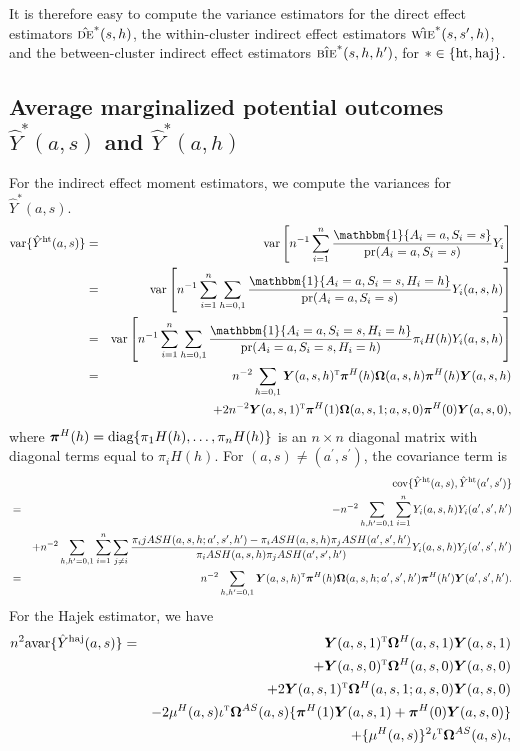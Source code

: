 \documentclass{article}
\def\T{{\textsc{t}}}
\newcommand{\pr}{\textup{pr}}
\newcommand{\cov}{\textup{cov}}
\newcommand{\var}{\textup{var}}
\newcommand{\avar}{\textup{avar}}
\newcommand{\bY}{\boldsymbol{Y}}
\newcommand{\bpi}{\boldsymbol{\pi}}
\newcommand{\bOmega}{\boldsymbol{\Omega}}
\newcommand{\sumi}{\sum_{i=1}^n}
\newcommand{\sumjneqi}{\sum_{j\neq i}}
\newcommand{\de}{\textsc{de}}
\newcommand{\bie}{\textsc{bie}}
\newcommand{\wie}{\textsc{wie}}
\newcommand{\horthom}{\textup{ht}}
\newcommand{\haj}{\textup{haj}}
\newcommand{\diag}{\textup{diag}}
\newcommand{\indicator}{\mathbbm{1}}
\newcommand{\ashprime}{a^{\prime},s^{\prime},h^{\prime}}
\newcommand{\pscore}[1]{\pi_{#1}}
\begin{document}
It is therefore easy to compute the variance estimators for the direct effect estimators $\hat{\de}^{*}(s,h)$, the within-cluster indirect effect estimators $\hat{\wie}^{*}(s,s^{\prime},h)$, and the between-cluster indirect effect estimators $\hat{\bie}^{*}(s,h,h^{\prime})$, for $*\in\{\horthom,\haj\}$.

\subsection{Average marginalized potential outcomes $\hat Y^{*}(a,s)$ and $\hat Y^{*}(a,h)$}
For the indirect effect moment estimators, we compute the variances for $\hat{Y}^{*}(a,s)$.
\begin{eqnarray*}
    \var\{\hat{Y}^{\horthom}(a,s)\} &=& \var \left[ n^{-1}\sumi\frac{ \indicator\{A_{i}=a, S_{i}=s\} }{ \pr(A_{i}=a, S_{i}=s)}Y_{i}\right] \\
    &=& \var \left[ n^{-1}\sumi\sum_{h=0,1}\frac{ \indicator\{A_{i}=a, S_{i}=s,H_i=h\} }{ \pr(A_{i}=a, S_{i}=s)}Y_{i}(a,s,h)\right] \\
    &=& \var \left[ n^{-1}\sumi\sum_{h=0,1}\frac{ \indicator\{A_{i}=a, S_{i}=s,H_i=h\} }{ \pr(A_{i}=a, S_{i}=s, H_{i}=h)}\pscore{i}{H}(h)Y_{i}(a,s,h)\right] \\
    &=& n^{-2} \sum_{h=0,1}\bY(a,s,h)^{\T}\bpi^{H}(h)\bOmega(a,s,h)\bpi^{H}(h)\bY(a,s,h) \\
    &&+ 2n^{-2}\bY(a,s,1)^{\T}\bpi^{H}(1)\bOmega(a,s,1;a,s,0)\bpi^{H}(0)\bY(a,s,0),
\end{eqnarray*}
where $\bpi^{H}(h) = \diag\{\pscore{1}{}{H}(h), \ldots, \pscore{n}{}{H}(h)\}$ is an $n\times n$ diagonal matrix with diagonal terms equal to $\pscore{i}{H}(h)$.
For $(a,s)\neq(a^{\prime},s^{\prime})$, the covariance term is
\begin{eqnarray*}
    && \cov\{\hat{Y}^{\horthom}(a,s), \hat{Y}^{\horthom}(a^{\prime},s^{\prime})\} \\
    &=& -n^{-2}\sum_{h,h^{\prime}=0,1}\sumi  Y_i(a, s, h) Y_i(\ashprime) \\ 
    &&+ n^{-2}\sum_{h,h^{\prime}=0,1}\sumi\sumjneqi \frac{\pscore{i}{j}{ASH}(a, s, h; \ashprime) - \pscore{i}{ASH}(a, s, h)\pscore{j}{}{ASH}(\ashprime)}{\pscore{i}{ASH}(a, s, h)\pscore{j}{}{ASH}(\ashprime)} Y_i(a, s, h) Y_j(\ashprime) \\
    &=& n^{-2}\sum_{h, h^{\prime}=0,1} \bY(a,s,h)^{\T} \bpi^{H}(h)\bOmega(a,s,h;\ashprime)\bpi^{H}(h^{\prime}) \bY(\ashprime).
\end{eqnarray*}
For the Hajek estimator, we have
\begin{eqnarray*}
    n^2\avar\{\hat Y^{\haj}(a,s)\} &=& \bY(a,s,1)^{\T} \bOmega^{H}(a,s,1) \bY(a,s,1) \\
    &&+ \bY(a,s,0)^{\T} \bOmega^{H}(a,s,0) \bY(a,s,0) \\
    &&+ 2\bY(a,s,1)^{\T} \bOmega^{H}(a,s,1;a,s,0) \bY(a,s,0) \\
    &&- 2\mu^{H}(a,s) \iota^{\T} \bOmega^{AS}(a,s) \{\bpi^{H}(1)\bY(a,s,1) + \bpi^{H}(0)\bY(a,s,0)\} \\
    &&+ \{\mu^{H}(a,s)\}^2 \iota^{\T} \bOmega^{AS}(a,s) \iota,
\end{eqnarray*}
\end{document}
